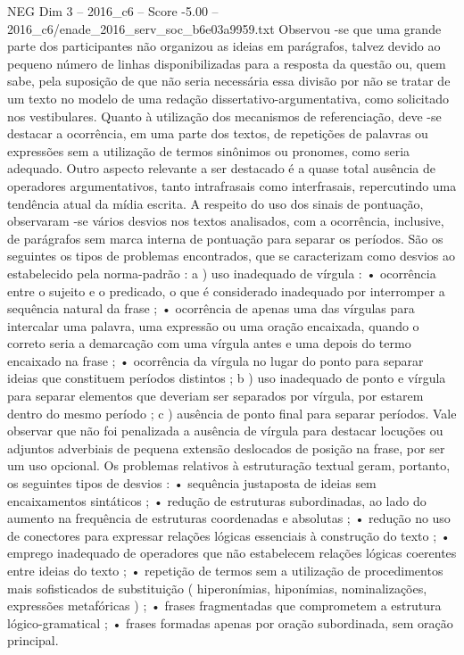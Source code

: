 \begin{textsample}{NEG Dim 3 – 2016\_c6 – Score -5.00 – 2016\_c6/enade\_2016\_serv\_soc\_b6e03a9959.txt}
Observou -se que uma grande parte dos participantes não organizou as ideias em parágrafos, talvez devido ao pequeno número de linhas disponibilizadas para a resposta da questão ou, quem sabe, pela suposição de que não seria necessária essa divisão por não se tratar de um texto no modelo de uma redação dissertativo-argumentativa, como solicitado nos vestibulares.
Quanto à utilização dos mecanismos de referenciação, deve -se destacar a ocorrência, em uma parte dos textos, de repetições de palavras ou expressões sem a utilização de termos sinônimos ou pronomes, como seria adequado.
Outro aspecto relevante a ser destacado é a quase total ausência de operadores argumentativos, tanto intrafrasais como interfrasais, repercutindo uma tendência atual da mídia escrita.
A respeito do uso dos sinais de pontuação, observaram -se vários desvios nos textos analisados, com a ocorrência, inclusive, de parágrafos sem marca interna de pontuação para separar os períodos.
São os seguintes os tipos de problemas encontrados, que se caracterizam como desvios ao estabelecido pela norma-padrão : a ) uso inadequado de vírgula : • ocorrência entre o sujeito e o predicado, o que é considerado inadequado por interromper a sequência natural da frase ; • ocorrência de apenas uma das vírgulas para intercalar uma palavra, uma expressão ou uma oração encaixada, quando o correto seria a demarcação com uma vírgula antes e uma depois do termo encaixado na frase ; • ocorrência da vírgula no lugar do ponto para separar ideias que constituem períodos distintos ; b ) uso inadequado de ponto e vírgula para separar elementos que deveriam ser separados por vírgula, por estarem dentro do mesmo período ; c ) ausência de ponto final para separar períodos.
Vale observar que não foi penalizada a ausência de vírgula para destacar locuções ou adjuntos adverbiais de pequena extensão deslocados de posição na frase, por ser um uso opcional.
Os problemas relativos à estruturação textual geram, portanto, os seguintes tipos de desvios : • sequência justaposta de ideias sem encaixamentos sintáticos ; • redução de estruturas subordinadas, ao lado do aumento na frequência de estruturas coordenadas e absolutas ; • redução no uso de conectores para expressar relações lógicas essenciais à construção do texto ; • emprego inadequado de operadores que não estabelecem relações lógicas coerentes entre ideias do texto ; • repetição de termos sem a utilização de procedimentos mais sofisticados de substituição ( hiperonímias, hiponímias, nominalizações, expressões metafóricas ) ; • frases fragmentadas que comprometem a estrutura lógico-gramatical ; • frases formadas apenas por oração subordinada, sem oração principal.

\end{textsample}
